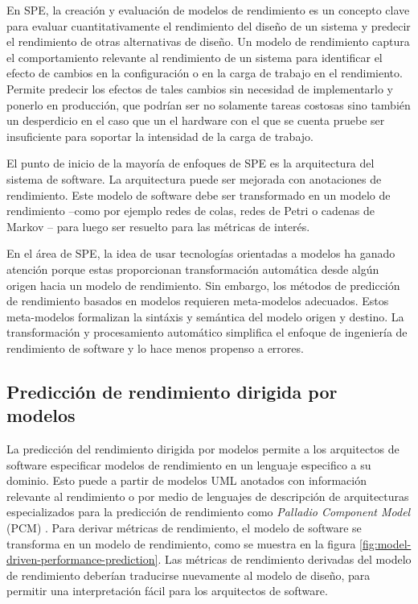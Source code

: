 \documentclass[11pt, twoside]{report}
\begin{document}
En SPE, la creación y evaluación de modelos de rendimiento es un concepto clave para evaluar cuantitativamente el rendimiento del diseño de un sistema y predecir el rendimiento de otras alternativas de diseño. Un modelo de rendimiento captura el comportamiento relevante al rendimiento de un sistema para identificar el efecto de cambios en la configuración o en la carga de trabajo en el rendimiento. Permite predecir los efectos de tales cambios sin necesidad de implementarlo y ponerlo en producción, que podrían ser no solamente tareas costosas sino también un desperdicio en el caso que un el hardware con el que se cuenta pruebe ser insuficiente para soportar la intensidad de la carga de trabajo.

El punto de inicio de la mayoría de enfoques de SPE es la arquitectura del sistema de software. La arquitectura puede ser mejorada con anotaciones de rendimiento. Este modelo de software debe ser transformado en un modelo de rendimiento --como por ejemplo redes de colas, redes de Petri o cadenas de Markov -- para luego ser resuelto para las métricas de interés.

En el área de SPE, la idea de usar tecnologías orientadas a modelos ha ganado atención porque estas proporcionan transformación automática desde algún origen hacia un modelo de rendimiento. Sin embargo, los métodos de predicción de rendimiento basados en modelos requieren meta-modelos adecuados. Estos meta-modelos formalizan la sintáxis y semántica del modelo origen y destino. La transformación y procesamiento automático simplifica el enfoque de ingeniería de rendimiento de software y lo hace menos propenso a errores.

\subsection{Predicción de rendimiento dirigida por modelos}
La predicción del rendimiento dirigida por modelos permite a los arquitectos de software especificar modelos de rendimiento en un lenguaje especifico a su dominio. Esto puede a partir de modelos UML anotados con información relevante al rendimiento o por medio de lenguajes de descripción de arquitecturas especializados para la predicción de rendimiento como \emph{Palladio Component Model} (PCM) \cite{palladio-seminal, palladio-blue-book}. Para derivar métricas de rendimiento, el modelo de software se transforma en un modelo de rendimiento, como se muestra en la figura \ref{fig:model-driven-performance-prediction}. Las métricas de rendimiento derivadas del modelo de rendimiento deberían traducirse nuevamente al modelo de diseño, para permitir una interpretación fácil para los arquitectos de software.
\end{document}

